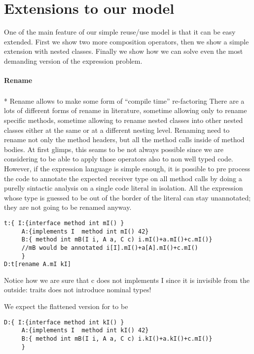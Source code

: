 \section{Extensions to our model}
  One of the main feature of our simple reuse/use model is that it can be
  easy extended. 
First we show two more composition operators, then we show 
a simple extension with nested classes.
Finally we show how we can solve even the most
demanding version of the expression problem.

\paragraph{Rename}${}_{}$\\*
Rename allows to make some form of ``compile time'' re-factoring
There are a lots of different forms of rename in literature,
sometime allowing only to rename specific methods, sometime allowing to rename
nested classes into other nested classes either at the same or at a different nesting level.
Renaming need to rename not only the method headers, but all the method calls inside of method bodies.
At first glimps, this seams to be not always possible since we are considering to be able to apply those
operators also to non well typed code.
However, if the expression language is simple enough, it is possible to pre process the code to
annotate the expected receiver type on all method calls by doing a purelly sintactic analysis
on a single code literal in isolation. 
All the expression whose type is guessed to be out of the border of the literal can stay unannotated; they are not going to be renamed anyway.

\begin{lstlisting}
t:{ I:{interface method int mI() }
     A:{implements I  method int mI() 42}
     B:{ method int mB(I i, A a, C c) i.mI()+a.mI()+c.mI()}
     //mB would be annotated i[I].mI()+a[A].mI()+c.mI()
     }
D:t[rename A.mI kI]
\end{lstlisting}
 Notice how we are sure that c does not implements I since it is invisible from the outside: traits does not introduce nominal types!
 
 We expect the flattened version for \Q@D@ to be
\begin{lstlisting}
D:{ I:{interface method int kI() }
     A:{implements I  method int kI() 42}
     B:{ method int mB(I i, A a, C c) i.kI()+a.kI()+c.mI()}
     }
\end{lstlisting}

